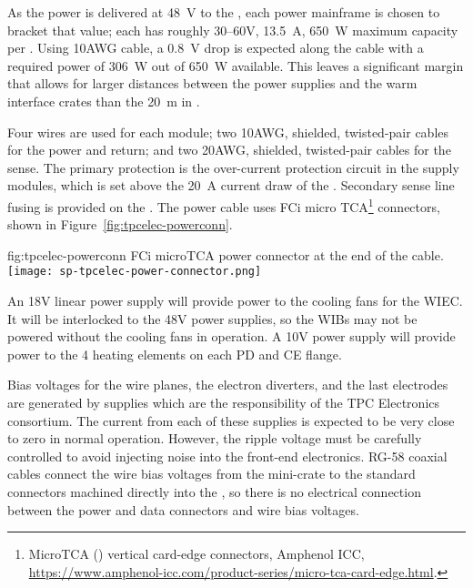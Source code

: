 As the  power is delivered at \SI{48}{V} to the , each  power mainframe is chosen to bracket that value; each has  
roughly \numrange{30}{60}{V}, \SI{13.5}{A}, \SI{650}{W} maximum capacity per . Using 10AWG cable, a \SI{0.8}{V} drop is 
expected along the cable with a required power of \SI{306}{W} out of \SI{650}{W} available.  
This leaves a significant margin that allows for larger distances between the power supplies and 
the warm interface crates than the \SI{20}{\meter} in .

Four wires are used for each module; two 10AWG, shielded, twisted-pair cables for the power and return; and two 20AWG, shielded, twisted-pair cables for the sense.
The primary protection is the over-current protection circuit in the  supply modules, 
which is set above the \SI{20}{A} current draw of the .  Secondary sense line fusing is 
provided on the .  The  power cable uses FCi micro TCA\footnote{MicroTCA\texttrademark{} () vertical card-edge connectors, Amphenol ICC,  \url{https://www.amphenol-icc.com/product-series/micro-tca-card-edge.html}.} connectors, shown in
Figure~\ref{fig:tpcelec-powerconn}.

\begin{dunefigure}
{fig:tpcelec-powerconn}
{FCi microTCA power connector at the  end of the cable.}
\texttt{[image: sp-tpcelec-power-connector.png]}
\end{dunefigure}

An 18V linear power supply will provide power to the cooling fans for the WIEC. It will be interlocked to the 48V power 
supplies, so the WIBs may not be powered without the cooling fans in operation. A 10V power supply will provide
power to the 4 heating elements on each PD and CE flange.

Bias voltages for the  wire planes, the electron diverters, and the last  electrodes are generated 
by supplies which are the responsibility of the TPC Electronics consortium.  The current from each of these supplies 
is expected to be very close to zero in normal operation.  However, the ripple voltage must be carefully controlled to 
avoid injecting noise into the front-end electronics.  RG-58 coaxial cables connect the wire bias voltages from the 
mini-crate to the standard  connectors machined directly into the  \fdth, so there is no electrical 
connection between the  power and data connectors and wire bias voltages.

